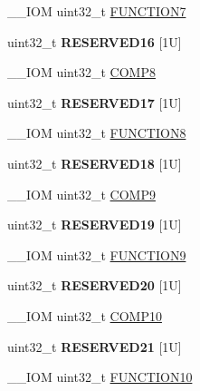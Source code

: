 \begin{DoxyCompactItemize}
\+\_\+\+\_\+\+I\+OM uint32\+\_\+t \mbox{\hyperlink{struct_d_w_t___type_ababf5d870650c4a480302b65bdb66741}{F\+U\+N\+C\+T\+I\+O\+N7}}
\item 
\mbox{\label{struct_d_w_t___type_a34e42d65754ab1a3f2db4363254f911f}} 
uint32\+\_\+t {\bfseries R\+E\+S\+E\+R\+V\+E\+D16} \mbox{[}1\+U\mbox{]}
\item 
\+\_\+\+\_\+\+I\+OM uint32\+\_\+t \mbox{\hyperlink{struct_d_w_t___type_aee138bc70746585e4ccf62557954c07f}{C\+O\+M\+P8}}
\item 
\mbox{\label{struct_d_w_t___type_a04c216ba5dbecb136097f61e5fa612b9}} 
uint32\+\_\+t {\bfseries R\+E\+S\+E\+R\+V\+E\+D17} \mbox{[}1\+U\mbox{]}
\item 
\+\_\+\+\_\+\+I\+OM uint32\+\_\+t \mbox{\hyperlink{struct_d_w_t___type_acdd6b87ea4bc95345687074c53098e75}{F\+U\+N\+C\+T\+I\+O\+N8}}
\item 
\mbox{\label{struct_d_w_t___type_ae16bddaf7ec543d72128a788c1405b4f}} 
uint32\+\_\+t {\bfseries R\+E\+S\+E\+R\+V\+E\+D18} \mbox{[}1\+U\mbox{]}
\item 
\+\_\+\+\_\+\+I\+OM uint32\+\_\+t \mbox{\hyperlink{struct_d_w_t___type_abf79b853fc2d25de9c03bdb183e4aee0}{C\+O\+M\+P9}}
\item 
\mbox{\label{struct_d_w_t___type_a0a6b643a661528e364e3825fff2306fe}} 
uint32\+\_\+t {\bfseries R\+E\+S\+E\+R\+V\+E\+D19} \mbox{[}1\+U\mbox{]}
\item 
\+\_\+\+\_\+\+I\+OM uint32\+\_\+t \mbox{\hyperlink{struct_d_w_t___type_a379b5b8f7d40003b7bdabd535e0378a1}{F\+U\+N\+C\+T\+I\+O\+N9}}
\item 
\mbox{\label{struct_d_w_t___type_a02405d82b0e7f6e27f3f7fac22ca7508}} 
uint32\+\_\+t {\bfseries R\+E\+S\+E\+R\+V\+E\+D20} \mbox{[}1\+U\mbox{]}
\item 
\+\_\+\+\_\+\+I\+OM uint32\+\_\+t \mbox{\hyperlink{struct_d_w_t___type_acf26842434e5cd1487a49812ec842d03}{C\+O\+M\+P10}}
\item 
\mbox{\label{struct_d_w_t___type_ae6ba892bac69bcf19cb3d998c63e2877}} 
uint32\+\_\+t {\bfseries R\+E\+S\+E\+R\+V\+E\+D21} \mbox{[}1\+U\mbox{]}
\item 
\+\_\+\+\_\+\+I\+OM uint32\+\_\+t \mbox{\hyperlink{struct_d_w_t___type_a63c72c28fd46b22230894366a8d9cdda}{F\+U\+N\+C\+T\+I\+O\+N10}}

\end{DoxyCompactItemize}
